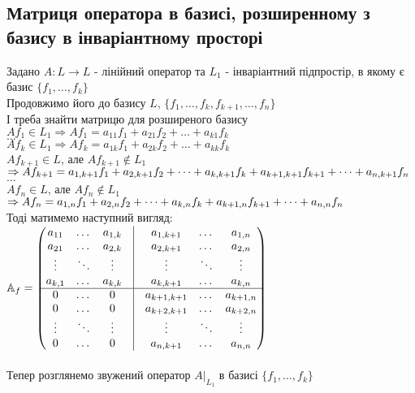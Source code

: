 \documentclass[a4paper, 14pt]{extarticle}
\begin{document}
\subsection{Матриця оператора в базисі, розширенному з базису в інваріантному просторі}
Задано $A: L \to L$ - лінійний оператор та $L_1$ - інваріантний підпростір, в якому є базис $\{f_1,\dots, f_k\}$\\
Продовжимо його до базису $L$, $\{f_1,\dots,f_k,f_{k+1},\dots,f_n\}$\\
І треба знайти матрицю для розширеного базису\\
$Af_1 \in L_1 \Rightarrow Af_1 = a_{11}f_1 + a_{21}f_2 + \dots + a_{k1}f_k$\\
$\dots$\\
$Af_k \in L_1 \Rightarrow Af_k = a_{1k}f_1 + a_{2k}f_2 + \dots + a_{kk}f_k$\\
$Af_{k+1} \in L $, але $Af_{k+1} \not\in L_1$ $\Rightarrow \\ Af_{k+1} = a_{1,k+1}f_1 + a_{2,k+1}f_2 + \dots + a_{k,k+1}f_k + a_{k+1,k+1}f_{k+1} + \dots + a_{n,k+1}f_n$\\
$\dots$\\
$Af_n \in L $, але $Af_n \not\in L_1$ $\Rightarrow \\ Af_n = a_{1,n}f_1 + a_{2,n}f_2 + \dots + a_{k,n}f_k + a_{k+1,n}f_{k+1} + \dots + a_{n,n}f_n$\\
Тоді матимемо наступний вигляд:\\
$\mathbb{A}_f = \begin{pmatrix}
a_{11} & \dots & a_{1,k} & \vline & a_{1,k+1} & \dots & a_{1, n} \\
a_{21} & \dots & a_{2,k} & \vline & a_{2,k+1} & \dots & a_{2, n} \\
\vdots & \ddots & \vdots & \vline & \vdots & \ddots & \vdots \\
a_{k,1} & \dots & a_{k,k} & \vline & a_{k,k+1} & \dots & a_{k, n} \\
\hline
0 & \dots & 0 & \vline & a_{k+1,k+1} & \dots & a_{k+1, n} \\
0 & \dots & 0 & \vline & a_{k+2,k+1} &  \dots & a_{k+2, n} \\
\vdots & \ddots & \vdots & \vline & \vdots & \ddots & \vdots \\
0 & \dots & 0 & \vline & a_{n,k+1} & \dots & a_{n, n} \\
\end{pmatrix}$\\
\\
Тепер розглянемо звужений оператор $A|_{L_1}$ в базисі $\{f_1,\dots,f_k\}$\\
\end{document}
